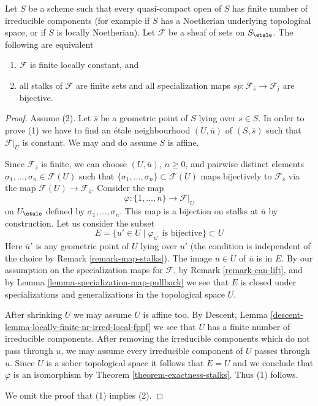 \begin{lemma}
\label{lemma-characterize-locally-constant}
Let $S$ be a scheme such that every quasi-compact open of $S$ has
finite number of irreducible components (for example if $S$ has a
Noetherian underlying topological space, or if $S$ is locally Noetherian).
Let $\mathcal{F}$ be a sheaf of sets on $S_\etale$.
The following are equivalent
\begin{enumerate}
\item $\mathcal{F}$ is finite locally constant, and
\item all stalks of $\mathcal{F}$ are finite sets and all specialization maps
$sp : \mathcal{F}_{\overline{s}} \to \mathcal{F}_{\overline{t}}$
are bijective.
\end{enumerate}
\end{lemma}

\begin{proof}
Assume (2). Let $\overline{s}$ be a geometric point of $S$ lying over
$s \in S$. In order to prove (1) we have to find an \'etale neighbourhood
$(U, \overline{u})$ of $(S, \overline{s})$ such that $\mathcal{F}|_U$
is constant. We may and do assume $S$ is affine.

\medskip\noindent
Since $\mathcal{F}_{\overline{s}}$ is finite, we can choose
$(U, \overline{u})$, $n \geq 0$, and pairwise distinct elements
$\sigma_1, \ldots, \sigma_n \in \mathcal{F}(U)$
such that $\{\sigma_1, \ldots, \sigma_n\} \subset \mathcal{F}(U)$ maps
bijectively to $\mathcal{F}_{\overline{s}}$ via the map
$\mathcal{F}(U) \to \mathcal{F}_{\overline{s}}$.
Consider the map
$$
\varphi : \underline{\{1, \ldots, n\}} \longrightarrow \mathcal{F}|_U
$$
on $U_\etale$ defined by $\sigma_1, \ldots, \sigma_n$.
This map is a bijection on stalks at $\overline{u}$
by construction. Let us consider the subset
$$
E = \{u' \in U \mid \varphi_{\overline{u}'}\text{ is bijective}\} \subset U
$$
Here $\overline{u}'$ is any geometric point of $U$ lying over $u'$
(the condition is independent of the choice by Remark \ref{remark-map-stalks}).
The image $u \in U$ of $\overline{u}$ is in $E$.
By our assumption on the specialization maps for $\mathcal{F}$,
by Remark \ref{remark-can-lift}, and by
Lemma \ref{lemma-specialization-map-pullback}
we see that $E$ is closed under specializations
and generalizations in the topological space $U$.

\medskip\noindent
After shrinking $U$ we may assume $U$ is affine too. By
Descent, Lemma \ref{descent-lemma-locally-finite-nr-irred-local-fppf}
we see that $U$ has a finite number of irreducible components.
After removing the irreducible components which do not pass
through $u$, we may assume every irreducible component of $U$
passes through $u$. Since $U$ is a sober topological space
it follows that $E = U$ and we conclude that $\varphi$ is an isomorphism by
Theorem \ref{theorem-exactness-stalks}. Thus (1) follows.

\medskip\noindent
We omit the proof that (1) implies (2).
\end{proof}

